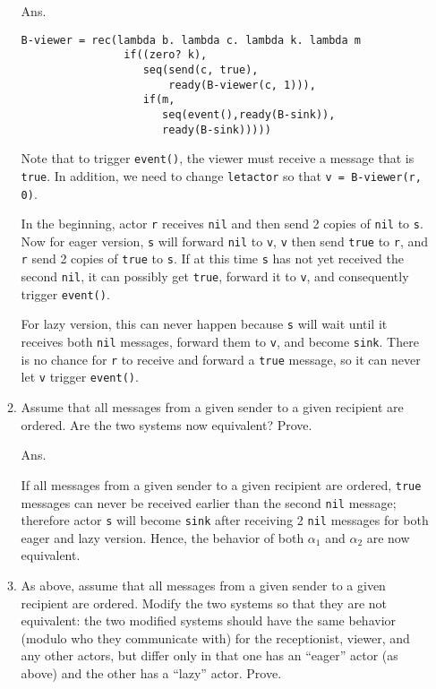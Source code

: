 \documentclass{article}
\begin{document}
\begin{enumerate}
\begin{enumerate}
Ans.

\begin{verbatim}
B-viewer = rec(lambda b. lambda c. lambda k. lambda m
                if((zero? k),
                   seq(send(c, true),
                       ready(B-viewer(c, 1))),
                   if(m,
                      seq(event(),ready(B-sink)),
                      ready(B-sink)))))
\end{verbatim}
Note that to trigger \texttt{event()}, the viewer must receive a message that
is \texttt{true}. In addition, we need to change \texttt{letactor} so that 
\texttt{v = B-viewer(r, 0)}.

In the beginning, actor \texttt{r} receives \texttt{nil} and then send 2 
copies of \texttt{nil} to \texttt{s}.
Now for eager version, \texttt{s} will forward \texttt{nil} to \texttt{v}, 
\texttt{v} then send \texttt{true} to \texttt{r}, and \texttt{r} send 2 
copies of \texttt{true} to \texttt{s}. If at this time \texttt{s} has not 
yet received the second \texttt{nil}, it can possibly get \texttt{true}, 
forward it to \texttt{v}, and consequently trigger \texttt{event()}.

For lazy version, this can never happen because \texttt{s} will wait until 
it receives both \texttt{nil} messages, forward them to \texttt{v}, and 
become \texttt{sink}. There is no chance for \texttt{r} to receive and 
forward a \texttt{true} message, so it can never let \texttt{v} trigger 
\texttt{event()}.

\item Assume that all messages from a given sender to a given recipient are
ordered. Are the two systems now equivalent? Prove.

Ans.

If all messages from a given sender to a given recipient are ordered,
\texttt{true} messages can never be received earlier than the second
\texttt{nil} message; therefore actor \texttt{s} will become \texttt{sink}
after receiving 2 \texttt{nil} messages for both eager and lazy version. Hence,
the behavior of both $\alpha_1$ and $\alpha_2$ are now equivalent.

\item As above, assume that all messages from a given sender to a given
recipient are ordered. Modify the two systems so that they are not equivalent:
the two modified systems should have the same behavior (modulo who they
communicate with) for the receptionist, viewer, and any other actors, but differ
only in that one has an ``eager'' actor (as above) and the other has a ``lazy''
actor. Prove.


\end{enumerate}
\end{enumerate}
\end{document}
